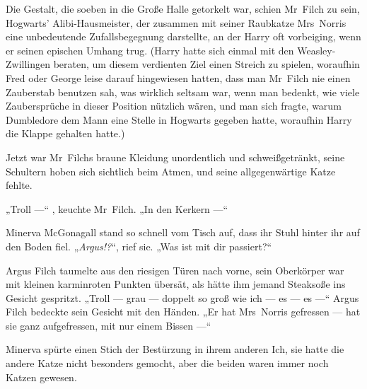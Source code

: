 Die Gestalt, die soeben in die Große Halle getorkelt war, schien Mr~Filch zu sein, Hogwarts’ Alibi-Hausmeister, der zusammen mit seiner Raubkatze Mrs~Norris eine unbedeutende Zufallsbegegnung darstellte, an der Harry oft vorbeiging, wenn er seinen epischen Umhang trug. (Harry hatte sich einmal mit den Weasley-Zwillingen beraten, um diesem verdienten Ziel einen Streich zu spielen, woraufhin Fred oder George leise darauf hingewiesen hatten, dass man Mr~Filch nie einen Zauberstab benutzen sah, was wirklich seltsam war, wenn man bedenkt, wie viele Zaubersprüche in dieser Position nützlich wären, und man sich fragte, warum Dumbledore dem Mann eine Stelle in Hogwarts gegeben hatte, woraufhin Harry die Klappe gehalten hatte.)

Jetzt war Mr~Filchs braune Kleidung unordentlich und schweißgetränkt, seine Schultern hoben sich sichtlich beim Atmen, und seine allgegenwärtige Katze fehlte.

„Troll —“ , keuchte Mr~Filch.
„In den Kerkern —“

\later


Minerva McGonagall stand so schnell vom Tisch auf, dass ihr Stuhl hinter ihr auf den Boden fiel.
„\emph{Argus!?}“, rief sie.
„Was ist mit dir passiert?“

Argus Filch taumelte aus den riesigen Türen nach vorne, sein Oberkörper war mit kleinen karminroten Punkten übersät, als hätte ihm jemand Steaksoße ins Gesicht gespritzt.
„Troll — grau — doppelt so groß wie ich — es — es —“ Argus Filch bedeckte sein Gesicht mit den Händen.
„Er hat Mrs~Norris gefressen — hat sie ganz aufgefressen, mit nur einem Bissen —“

Minerva spürte einen Stich der Bestürzung in ihrem anderen Ich, sie hatte die andere Katze nicht besonders gemocht, aber die beiden waren immer noch Katzen gewesen.


